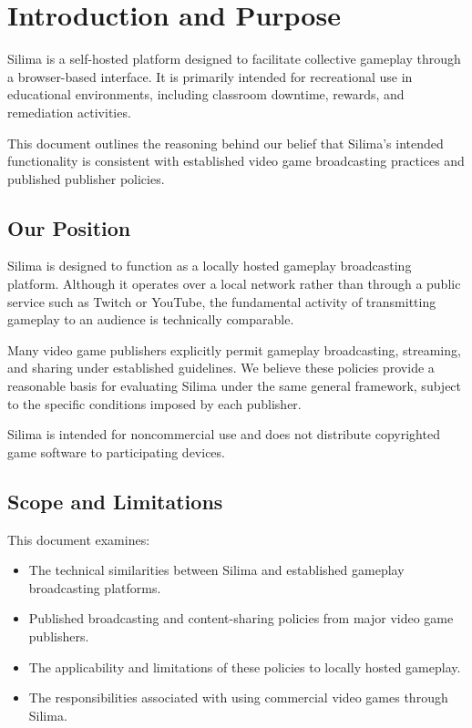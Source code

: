 \section{Introduction and Purpose}

Silima is a self-hosted platform designed to facilitate
collective gameplay through a browser-based interface.
It is primarily intended for recreational use in
educational environments, including classroom downtime,
rewards, and remediation activities.

This document outlines the reasoning behind our belief
that Silima's intended functionality is consistent with
established video game broadcasting practices and
published publisher policies.

\subsection{Our Position}

Silima is designed to function as a locally hosted
gameplay broadcasting platform. Although it operates
over a local network rather than through a public
service such as Twitch or YouTube, the fundamental
activity of transmitting gameplay to an audience
is technically comparable.

Many video game publishers explicitly permit gameplay
broadcasting, streaming, and sharing under established
guidelines. We believe these policies provide a
reasonable basis for evaluating Silima under the same
general framework, subject to the specific conditions
imposed by each publisher.

Silima is intended for noncommercial use and does
not distribute copyrighted game software to
participating devices.

\subsection{Scope and Limitations}

This document examines:
\begin{itemize}
    \item The technical similarities between Silima
          and established gameplay broadcasting platforms.
    \item Published broadcasting and content-sharing
          policies from major video game publishers.
    \item The applicability and limitations of these
          policies to locally hosted gameplay.
    \item The responsibilities associated with using
          commercial video games through Silima.
\end{itemize}

